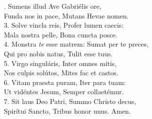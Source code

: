 . Sumens illud Ave Gabriélis ore,\\
Funda nos in pace, Mutans Hevae nomen.\\

3. Solve vincla reis, Profer lumen caecis:\\
Mala nostra pelle, Bona cuncta posce.\\

4. Monstra \textit{te} esse matrem: Sumat per te preces,\\
Qui pro nobis natus, Tulit esse tuus.\\

5. Virgo singuláris, Inter omnes mitis,\\
Nos culpis solútos, Mites fac et castos.\\

6. Vitam praesta puram, Iter para tuam:\\
Ut vidéntes Jesum, Semper collaetémur.\\

7. Sit laus Deo Patri, Summo Christo decus,\\
Spirítui Sancto, Tribus honor unus. Amen.\\
